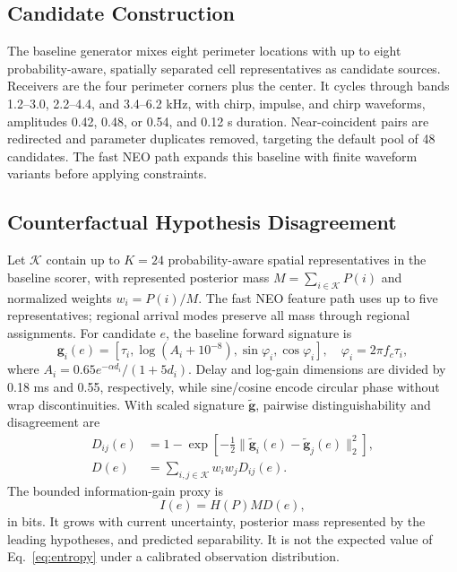 \documentclass[conference]{IEEEtran}
\newcommand{\vect}[1]{\boldsymbol{#1}}
\begin{document}
\subsection{Candidate Construction}
The baseline generator mixes eight perimeter locations with up to eight probability-aware, spatially separated cell representatives as candidate sources. Receivers are the four perimeter corners plus the center. It cycles through bands 1.2--3.0, 2.2--4.4, and 3.4--6.2 kHz, with chirp, impulse, and chirp waveforms, amplitudes 0.42, 0.48, or 0.54, and 0.12 s duration. Near-coincident pairs are redirected and parameter duplicates removed, targeting the default pool of 48 candidates. The fast NEO path expands this baseline with finite waveform variants before applying constraints.

\subsection{Counterfactual Hypothesis Disagreement}
Let $\mathcal{K}$ contain up to $K=24$ probability-aware spatial representatives in the baseline scorer, with represented posterior mass $M=\sum_{i\in\mathcal{K}}P(i)$ and normalized weights $w_i=P(i)/M$. The fast NEO feature path uses up to five representatives; regional arrival modes preserve all mass through regional assignments. For candidate $e$, the baseline forward signature is
\begin{equation}
 \vect{g}_i(e)=\left[\tau_i,\log(A_i+10^{-8}),\sin\varphi_i,\cos\varphi_i\right],
 \quad \varphi_i=2\pi f_c\tau_i,
 \end{equation}
where $A_i=0.65e^{-\alpha d_i}/(1+5d_i)$. Delay and log-gain dimensions are divided by 0.18 ms and 0.55, respectively, while sine/cosine encode circular phase without wrap discontinuities. With scaled signature $\tilde{\vect g}$, pairwise distinguishability and disagreement are
\begin{align}
 D_{ij}(e)&=1-\exp\left[-\tfrac12\|\tilde{\vect g}_i(e)-\tilde{\vect g}_j(e)\|_2^2\right],\\
 D(e)&=\sum_{i,j\in\mathcal{K}}w_iw_jD_{ij}(e).
 \label{eq:disagreement}
\end{align}
The bounded information-gain proxy is
\begin{equation}
 I(e)=H(P)M D(e),
 \label{eq:eig}
\end{equation}
in bits. It grows with current uncertainty, posterior mass represented by the leading hypotheses, and predicted separability. It is not the expected value of Eq.~\eqref{eq:entropy} under a calibrated observation distribution.
\end{document}
